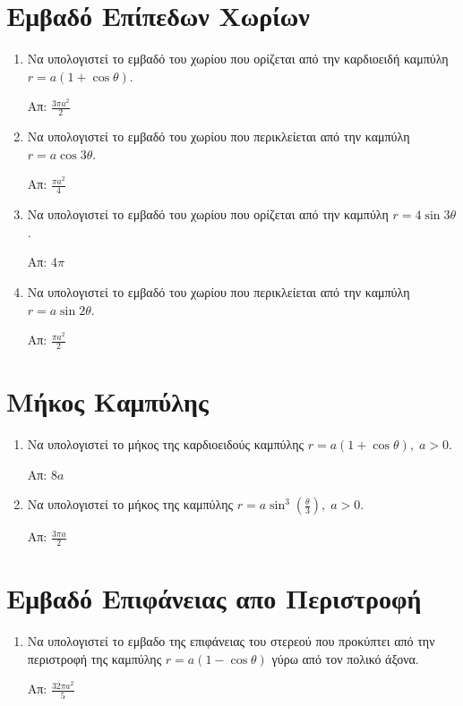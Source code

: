 


\everymath{\displaystyle}

\thispagestyle{askhseis}


\begin{center}
  \minibox{\large\bfseries \textcolor{Col1}{Πολικές Καμπύλες}}
\end{center}

\vspace{\baselineskip}


\section*{Εμβαδό Επίπεδων Χωρίων}

\begin{enumerate}
  \item Να υπολογιστεί το εμβαδό του χωρίου που ορίζεται από την καρδιοειδή καμπύλη
    $ r = a(1  + \cos{\theta}) $.

    \hfill Απ: $ \frac{3\pi a^{2}}{2} $

  \item Να υπολογιστεί το εμβαδό του χωρίου που περικλείεται από την καμπύλη $
    r = a \cos{3\theta} $.

    \hfill Απ: $ \frac{\pi a^{2}}{4} $

  \item Να υπολογιστεί το εμβαδό του χωρίου που ορίζεται από την καμπύλη 
    $ r = 4 \sin{3\theta}  $. 

    \hfill Απ: $ 4 \pi $  

  \item Να υπολογιστεί το εμβαδό του χωρίου που περικλείεται από την καμπύλη $
    r = a \sin{2\theta} $.

    \hfill Απ: $ \frac{\pi a^{2}}{2} $

\end{enumerate}



\section*{Μήκος Καμπύλης}


\begin{enumerate}
  \item Να υπολογιστεί το μήκος της καρδιοειδούς καμπύλης $ r = a(1 + \cos{\theta}), 
    \; a>0 $.

    \hfill Απ: $ 8 a $

  \item Να υπολογιστεί το μήκος της καμπύλης 
    $ r = a\sin^{3}{\left(\frac{\theta}{3}\right)}, \; a>0 $.

    \hfill Απ: $ \frac{3 \pi a}{2} $ 
\end{enumerate}




\section*{Εμβαδό Επιφάνειας απο Περιστροφή}

\begin{enumerate}
  \item Να υπολογιστεί το εμβαδο της επιφάνειας του στερεού που προκύπτει από την
    περιστροφή της καμπύλης $ r = a(1 - \cos{\theta}) $ γύρω από τον πολικό
    άξονα. 

    \hfill Απ: $ \frac{32 \pi  a^{2}}{5} $
\end{enumerate}


